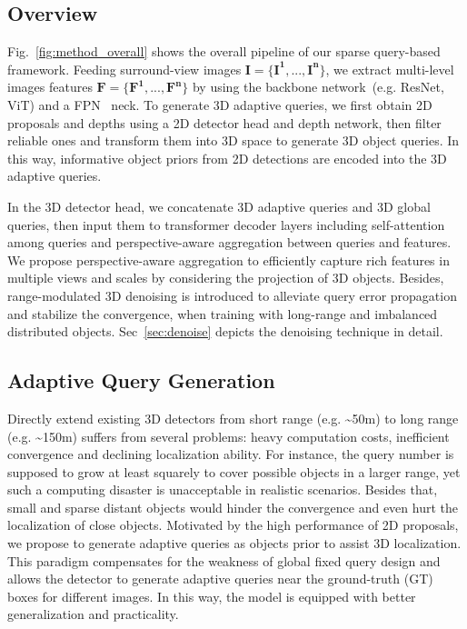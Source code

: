 \documentclass[letterpaper]{article} \usepackage{aaai24}
\begin{document}
\subsection{Overview}
Fig.~\ref{fig:method_overall} shows the overall pipeline of our sparse query-based framework. 
Feeding surround-view images $\mathbf{I}=\{\mathbf{I^1, ..., I^n}\}$, we extract  multi-level images features $\mathbf{F}=\{\mathbf{F^1, ..., F^n}\}$ by using the backbone network~(e.g. ResNet, ViT) and a FPN~\cite{lin2017feature} neck. 
To generate 3D adaptive queries, we first obtain 2D proposals and depths using a 2D detector head and depth network, then filter reliable ones and transform them into 3D space to generate 3D object queries. In this way, informative object priors from 2D detections are encoded into the 3D adaptive queries.

In the 3D detector head, we concatenate 3D adaptive queries and 3D global queries, then input them to transformer decoder layers including self-attention among queries and perspective-aware aggregation between queries and features. We propose perspective-aware aggregation to efficiently capture rich features in multiple views and scales by considering the projection of 3D objects. Besides, range-modulated 3D denoising is introduced to alleviate query error propagation and stabilize the convergence, when training with long-range and imbalanced distributed objects. Sec~\ref{sec:denoise} depicts the denoising technique in detail.

\subsection{Adaptive Query Generation}
Directly extend existing 3D detectors from short range (e.g. \textasciitilde50m) to long range (e.g. \textasciitilde150m) suffers from several problems: heavy computation costs, inefficient convergence and declining localization ability. For instance, the query number is supposed to grow at least squarely to cover possible objects in a larger range, yet such a computing disaster is unacceptable in realistic scenarios. Besides that, small and sparse distant objects would hinder the convergence and even hurt the localization of close objects. 
Motivated by the high performance of 2D proposals, we propose to generate adaptive queries as objects prior to assist 3D localization. This paradigm compensates for the weakness of global fixed query design and allows the detector to generate adaptive queries near the ground-truth (GT) boxes for different images. In this way, the model is equipped with better generalization and practicality.
\end{document}
